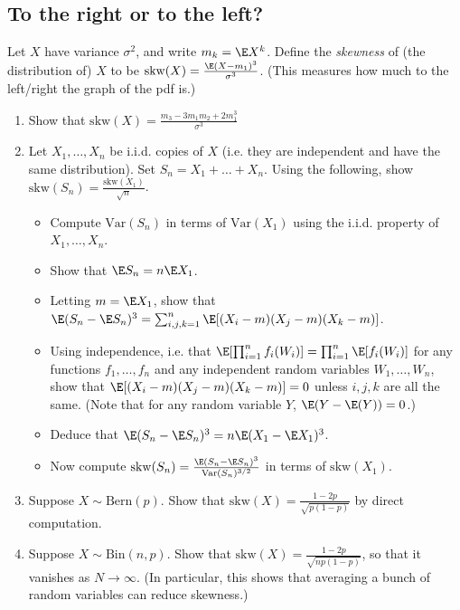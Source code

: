 \documentclass[12pt,reqno]{amsart}
\theoremstyle{definition}
\theoremstyle{remark}
\numberwithin{equation}{section}
\begin{document}
\subsection{To the right or to the left?}
Let $X$ have variance $\sigma^{2}$, and write $m_{k}=\E X^{k}$. Define the \emph{skewness} of (the distribution of) $X$ to be $\mathrm{skw}(X)=\frac{\E(X-m_{1})^{3}}{\sigma^{3}}$. (This measures how much to the left/right the graph of the pdf is.)
\begin{enumerate}
\item Show that $\mathrm{skw}(X)=\frac{m_{3}-3m_{1}m_{2}+2m_{1}^{3}}{\sigma^{3}}$
\item Let $X_{1},\ldots,X_{n}$ be i.i.d. copies of $X$ (i.e. they are independent and have the same distribution). Set $S_{n}=X_{1}+\ldots+X_{n}$. Using the following, show $\mathrm{skw}(S_{n})=\frac{\mathrm{skw}(X_{1})}{\sqrt{n}}$.
\begin{itemize}
\item Compute $\mathrm{Var}(S_{n})$ in terms of $\mathrm{Var}(X_{1})$ using the i.i.d. property of $X_{1},\ldots,X_{n}$.
\item Show that $\E S_{n}=n\E X_{1}$.
\item Letting $m=\E X_{1}$, show that $\E(S_{n}-\E S_{n})^{3}=\sum_{i,j,k=1}^{n}\E[(X_{i}-m)(X_{j}-m)(X_{k}-m)]$.
\item Using independence, i.e. that $\E[\prod_{i=1}^{n}f_{i}(W_{i})]=\prod_{i=1}^{n}\E[f_{i}(W_{i})]$ for any functions $f_{1},\ldots,f_{n}$ and any independent random variables $W_{1},\ldots,W_{n}$, show that $\E[(X_{i}-m)(X_{j}-m)(X_{k}-m)]=0$ unless $i,j,k$ are all the same. (Note that for any random variable $Y$, $\E(Y-\E(Y))=0$.)
\item Deduce that $\E(S_{n}-\E S_{n})^{3}=n\E(X_{1}-\E X_{1})^{3}$.
\item Now compute $\mathrm{skw}(S_{n})=\frac{\E(S_{n}-\E S_{n})^{3}}{\mathrm{Var}(S_{n})^{3/2}}$ in terms of $\mathrm{skw}(X_{1})$. 
\end{itemize}
\item Suppose $X\sim\mathrm{Bern}(p)$. Show that $\mathrm{skw}(X)=\frac{1-2p}{\sqrt{p(1-p)}}$ by direct computation.
\item Suppose $X\sim\mathrm{Bin}(n,p)$. Show that $\mathrm{skw}(X)=\frac{1-2p}{\sqrt{np(1-p)}}$, so that it vanishes as $N\to\infty$. (In particular, this shows that averaging a bunch of random variables can reduce skewness.)
\end{enumerate}
\end{document}
